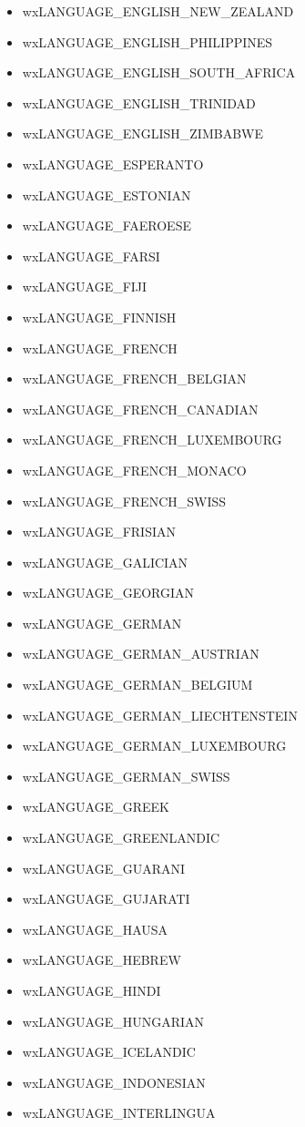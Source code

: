 \begin{itemize}
\item wxLANGUAGE\_ENGLISH\_NEW\_ZEALAND
\item wxLANGUAGE\_ENGLISH\_PHILIPPINES
\item wxLANGUAGE\_ENGLISH\_SOUTH\_AFRICA
\item wxLANGUAGE\_ENGLISH\_TRINIDAD
\item wxLANGUAGE\_ENGLISH\_ZIMBABWE
\item wxLANGUAGE\_ESPERANTO
\item wxLANGUAGE\_ESTONIAN
\item wxLANGUAGE\_FAEROESE
\item wxLANGUAGE\_FARSI
\item wxLANGUAGE\_FIJI
\item wxLANGUAGE\_FINNISH
\item wxLANGUAGE\_FRENCH
\item wxLANGUAGE\_FRENCH\_BELGIAN
\item wxLANGUAGE\_FRENCH\_CANADIAN
\item wxLANGUAGE\_FRENCH\_LUXEMBOURG
\item wxLANGUAGE\_FRENCH\_MONACO
\item wxLANGUAGE\_FRENCH\_SWISS
\item wxLANGUAGE\_FRISIAN
\item wxLANGUAGE\_GALICIAN
\item wxLANGUAGE\_GEORGIAN
\item wxLANGUAGE\_GERMAN
\item wxLANGUAGE\_GERMAN\_AUSTRIAN
\item wxLANGUAGE\_GERMAN\_BELGIUM
\item wxLANGUAGE\_GERMAN\_LIECHTENSTEIN
\item wxLANGUAGE\_GERMAN\_LUXEMBOURG
\item wxLANGUAGE\_GERMAN\_SWISS
\item wxLANGUAGE\_GREEK
\item wxLANGUAGE\_GREENLANDIC
\item wxLANGUAGE\_GUARANI
\item wxLANGUAGE\_GUJARATI
\item wxLANGUAGE\_HAUSA
\item wxLANGUAGE\_HEBREW
\item wxLANGUAGE\_HINDI
\item wxLANGUAGE\_HUNGARIAN
\item wxLANGUAGE\_ICELANDIC
\item wxLANGUAGE\_INDONESIAN
\item wxLANGUAGE\_INTERLINGUA

\end{itemize}
